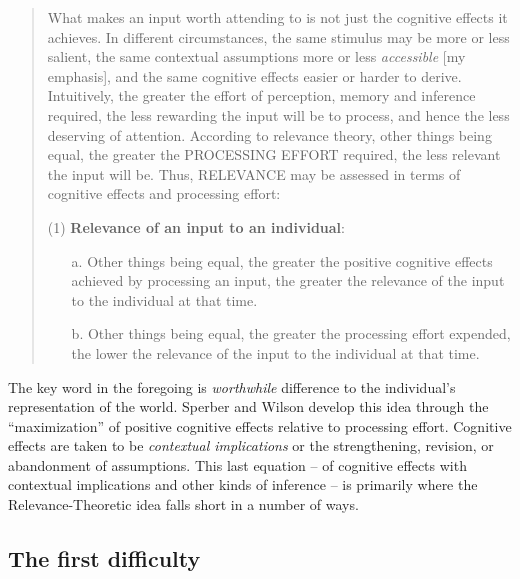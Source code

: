 \begin{quote}
What makes an input worth attending to is not just the cognitive effects it achieves. In different circumstances, the same stimulus may be more or less salient, the same contextual assumptions more or less \emph{accessible} [my emphasis], and the same cognitive effects easier or harder to derive. Intuitively, the greater the effort of perception, memory and inference required, the less rewarding the input will be to process, and hence the less deserving of attention. According to relevance theory, other things being equal, the greater the PROCESSING EFFORT required, the less relevant the input will be. Thus, RELEVANCE may be assessed in terms of cognitive effects and processing effort:

(1) \textbf{Relevance of an input to an individual}:

\begin{itemize}
\item[a.] Other things being equal, the greater the positive cognitive effects achieved by processing an input, the greater the relevance of the input to the individual at that time.
\item[b.] Other things being equal, the greater the processing effort expended, the lower the relevance of the input to the individual at that time. 
\end{itemize}\vspace{-\baselineskip}
\hbox{}\hfill{\hbox{\citep[608--609]{sw:rt}}}
\end{quote}


\noindent The key word in the foregoing is \emph{worthwhile} difference to the individual's representation of the world. Sperber and Wilson develop this idea through the ``maximization'' of positive cognitive effects relative to processing effort. Cognitive effects are taken to be \emph{contextual implications} or the strengthening, revision, or abandonment of assumptions. This last equation -- of cognitive effects with contextual implications and other kinds of inference -- is primarily where the Relevance-Theoretic idea falls short in a number of ways.


\subsection{The first difficulty}

